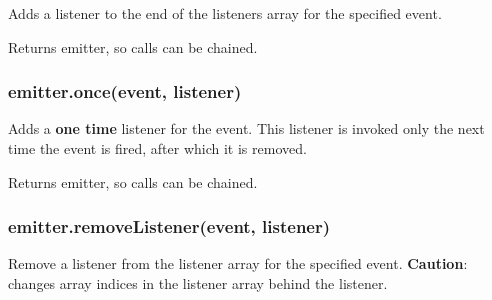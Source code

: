 Adds a listener to the end of the listeners array for the specified
event.

\begin{Shaded}
\begin{Highlighting}[]
\NormalTok{(}\NormalTok{, } 
  \NormalTok{(}\NormalTok{);}
\NormalTok{\});}
\end{Highlighting}
\end{Shaded}

Returns emitter, so calls can be chained.

\subsubsection{emitter.once(event,
listener)}\label{emitter.onceevent-listener}

Adds a \textbf{one time} listener for the event. This listener is
invoked only the next time the event is fired, after which it is
removed.

\begin{Shaded}
\begin{Highlighting}[]
\NormalTok{(}\NormalTok{, } 
  \NormalTok{(}\NormalTok{);}
\NormalTok{\});}
\end{Highlighting}
\end{Shaded}

Returns emitter, so calls can be chained.

\subsubsection{emitter.removeListener(event,
listener)}\label{emitter.removelistenerevent-listener}

Remove a listener from the listener array for the specified event.
\textbf{Caution}: changes array indices in the listener array behind the
listener.

\begin{Shaded}
\begin{Highlighting}[]
 
  \NormalTok{(}\NormalTok{);}
\NormalTok{\};}
\NormalTok{(}
\NormalTok{(}
\end{Highlighting}
\end{Shaded}

